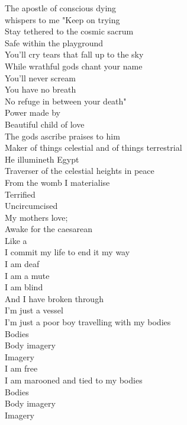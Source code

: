 
The apostle of conscious dying\\
whispers to me "Keep on trying\\
Stay tethered to the cosmic sacrum\\
Safe within the  playground\\
You'll cry tears that fall up to the sky\\
While wrathful gods chant your name\\
You'll never scream\\
You have no breath\\
No refuge in between your death"\\

Power made by \\
Beautiful child of love\\
The gods ascribe praises to him\\
Maker of things celestial and of things terrestrial\\
He illumineth Egypt\\
Traverser of the celestial heights in peace\\

From the womb I materialise\\
Terrified\\
Uncircumcised\\
My mothers love; \\
Awake for the caesarean\\
Like a \\
I commit my life to end it my way\\
I am deaf\\
I am a mute\\
I am blind\\
And I have broken through\\

I'm just a vessel\\
I'm just a poor boy travelling with my bodies\\
Bodies\\
Body imagery\\
Imagery\\
I am free\\
I am marooned and tied to my bodies\\
Bodies\\
Body imagery\\
Imagery\\

